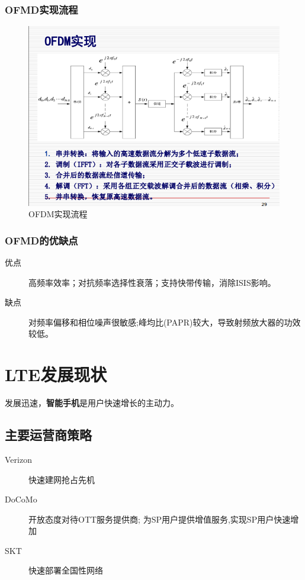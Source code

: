 \documentclass{report}
\begin{document}
	\subsubsection{OFMD实现流程}
	\begin{figure}[H]
		\centering
		\includegraphics[width=\linewidth]{OFDM实现流程}
		\caption{OFDM实现流程}
		\label{fig:ofdm}
	\end{figure}
	\subsubsection{OFMD的优缺点}
	\begin{description}
		\item[优点] 高频率效率；对抗频率选择性衰落；支持快带传输，消除ISIS影响。
		\item[缺点] 对频率偏移和相位噪声很敏感;峰均比(PAPR)较大，导致射频放大器的功效较低。
	\end{description}
	\section{LTE发展现状}
	发展迅速，\textbf{智能手机}是用户快速增长的主动力。
	\subsection{主要运营商策略}
	\begin{description}
		\item[Verizon
		]  快速建网抢占先机
		\item[DoCoMo] 开放态度对待OTT服务提供商; 为SP用户提供增值服务,实现SP用户快速增加	
		\item[SKT]  快速部署全国性网络
	\end{description}
\end{document}
